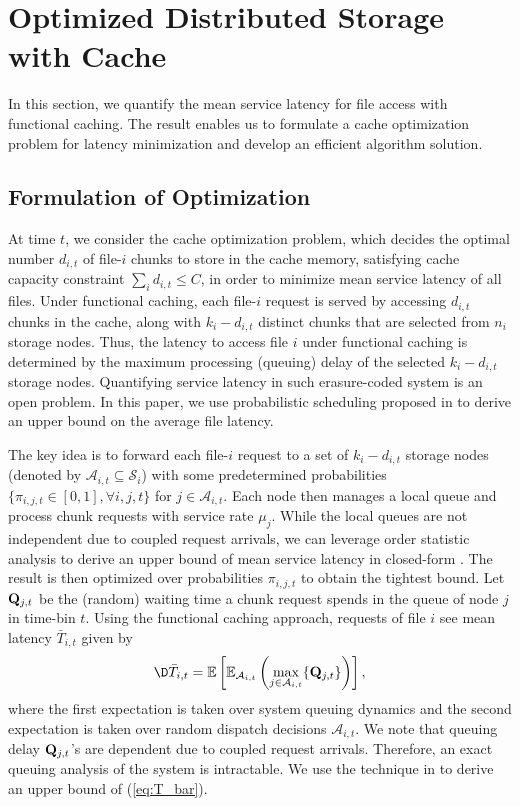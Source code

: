 \section{Optimized Distributed Storage with Cache}

In this section, we quantify the mean service latency for file access with functional caching. The result enables us to formulate a cache optimization problem for latency minimization and develop an efficient algorithm solution.

\subsection{Formulation of Optimization}

At time $t$, we consider the cache optimization problem, which decides the optimal number $d_{i,t}$ of file-$i$ chunks to store in the cache memory, satisfying cache capacity constraint $\sum_id_{i,t}\le C$, in order to minimize mean service latency of all files. Under functional caching, each file-$i$ request is served by accessing $d_{i,t}$ chunks in the cache, along with $k_i-d_{i,t}$ distinct chunks that are selected from $n_i$ storage nodes. Thus, the latency to access file $i$ under functional caching is determined by the maximum processing (queuing) delay of the selected $k_i-d_{i,t}$ storage nodes. Quantifying service latency in such erasure-coded system is an open problem. In this paper, we use probabilistic scheduling proposed in \cite{Yu_TON} to derive an upper bound on the average file latency.

The key idea is to forward each file-$i$ request to a set of $k_i-d_{i,t}$ storage nodes (denoted by $\mathcal{A}_{i,t}\subseteq \mathcal{S}_i$) with some predetermined probabilities $\{\pi_{i,j,t}\in [0,1], \forall i,j,t\}$ for $j\in\mathcal{A}_{i,t}$. Each node then manages a local queue and process chunk requests with service rate $\mu_j$. While the local queues are not independent due to coupled request arrivals, we can leverage order statistic analysis to derive an upper bound of mean service latency in closed-form \cite{Yu_TON}. The result is then optimized over probabilities $\pi_{i,j,t}$ to obtain the tightest bound. Let ${\bf Q}_{j,t}$ be the (random) waiting time a chunk request spends in the queue of node $j$ in time-bin $t$. Using the functional caching approach, requests of file $i$ see mean latency $\bar{T}_{i,t}$ given by
\vspace{-.1in}\begin{eqnarray}
\D \bar{T}_{i,t}= \mathbb{E}\left[\mathbb{E}_{\mathcal{A}_{i,t}} \left(\max_{ j\in \mathcal{A}_{i,t}} \{ {\bf Q}_{j,t} \} \right) \right], \label{eq:T_bar}
\end{eqnarray}
where the first expectation is taken over system queuing dynamics and the second expectation is taken over random dispatch decisions $\mathcal{A}_{i,t}$. We note that queuing delay ${\bf Q}_{j,t}$'s are dependent due to coupled request arrivals. Therefore, an exact queuing analysis of the system is intractable. We use the technique in \cite{Yu_TON} to derive an upper bound of (\ref{eq:T_bar}).

